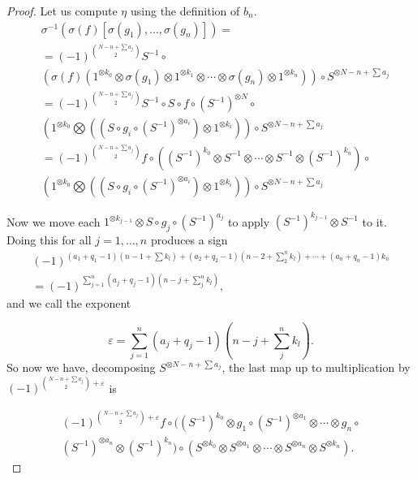 \documentclass[Thesis.tex]{subfiles}
\begin{document}
\begin{proof}
Let us compute $\eta$ using the definition of $b_n$.
\begin{align*}
&\sigma^{-1}(\sigma(f)[\sigma(g_1),\dots, \sigma(g_n)])=\\ &=(-1)^{\binom{N-n+\sum a_j}{2}}S^{-1}\circ\\ 
&(\sigma(f)(1^{\otimes k_0}\otimes \sigma(g_1)\otimes 1^{\otimes k_1}\otimes\cdots\otimes \sigma(g_n)\otimes 1^{\otimes k_n}))\circ S^{\otimes N-n+\sum a_j}\\
&=(-1)^{\binom{N-n+\sum a_j}{2}}S^{-1}\circ S\circ f\circ (S^{-1})^{\otimes N}\circ \\ &\left(1^{\otimes k_0}\bigotimes ((S\circ g_i\circ (S^{-1})^{\otimes a_i})\otimes 1^{\otimes k_i})\right)\circ  S^{\otimes N-n+\sum a_j}\\
&=(-1)^{\binom{N-n+\sum a_j}{2}}f\circ ((S^{-1})^{k_0}\otimes  S^{-1}\otimes\cdots \otimes  S^{-1}\otimes  (S^{-1})^{k_n})\circ\\ 
&\left(1^{\otimes k_0}\bigotimes ((S\circ g_i\circ (S^{-1})^{\otimes a_i})\otimes 1^{\otimes k_i})\right)\circ  S^{\otimes N-n+\sum a_j}
\end{align*}
%


Now we move each $1^{\otimes k_{j-1}}\otimes S\circ g_j\circ (S^{-1})^{a_j}$ to apply $(S^{-1})^{k_{j-1}}\otimes S^{-1}$ to it. Doing this for all $j=1,\dots, n$ produces a sign
\begin{align*}
(-1)^{(a_1+q_1-1)(n-1+\sum k_l)+(a_2+q_2-1)(n-2+\sum_2^n k_l)+\cdots+(a_n+q_n-1)k_n}\\
=(-1)^{\sum_{j=1}^n (a_j+q_j-1)(n-j+\sum_j^n k_l)},
\end{align*}
 and we call the exponent
 
 $$\varepsilon=\sum_{j=1}^n (a_j+q_j-1)\left(n-j+\sum_j^n k_l\right).$$ So now we have, decomposing $S^{\otimes N-n+\sum a_j}$, the last map up to multiplication by $(-1)^{\binom{N-n+\sum a_j}{2}+\varepsilon}$ is
 
 \begin{gather*}
 (-1)^{\binom{N-n+\sum a_j}{2}+\varepsilon}f\circ((S^{-1})^{k_0}\otimes  g_1\circ (S^{-1})^{\otimes a_1}\otimes\cdots \otimes  g_n\circ\\ (S^{-1})^{\otimes a_n}\otimes  (S^{-1})^{k_n})\circ (S^{\otimes k_0}\otimes S^{\otimes a_1}\otimes\cdots\otimes S^{\otimes a_n}\otimes S^{\otimes k_n}).
 \end{gather*}
 

\end{proof}
\end{document}
